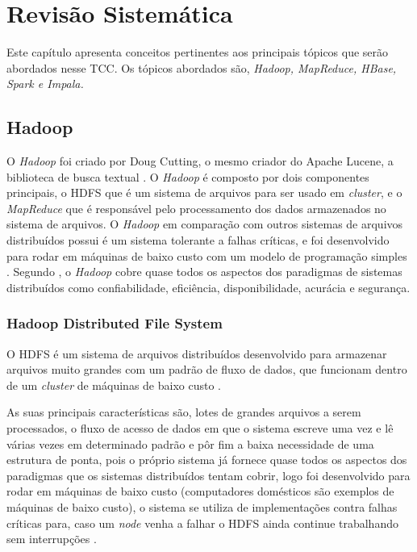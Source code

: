 \chapter[Revisão Sistemática]{Revisão Sistemática}

    Este capítulo apresenta conceitos pertinentes aos principais tópicos que serão abordados
    nesse TCC. Os tópicos abordados são, \textit{Hadoop, MapReduce, HBase, Spark e Impala.}

    \section{Hadoop}

            O \textit{Hadoop} foi criado por Doug Cutting, o mesmo criador do Apache Lucene, a biblioteca de busca
            textual \cite{white2015}. O \textit{Hadoop} é composto por dois componentes principais, o HDFS que é
            um sistema de arquivos para ser usado em \textit{cluster}, e o \textit{MapReduce} que é responsável
            pelo processamento dos dados armazenados no sistema de arquivos. O \textit{Hadoop} em comparação
            com outros sistemas de arquivos distribuídos possui é um sistema tolerante a falhas críticas, e foi
            desenvolvido para rodar em máquinas de baixo custo com um modelo de programação simples
            \cite{alam2014}. Segundo , o \textit{Hadoop} cobre quase todos os aspectos dos
            paradigmas de sistemas distribuídos como confiabilidade, eficiência, disponibilidade, acurácia e segurança.

        \subsection{Hadoop Distributed File System}

            O HDFS é um sistema de arquivos distribuídos desenvolvido para armazenar arquivos muito grandes
            com um padrão de fluxo de dados, que funcionam dentro de um \textit{cluster} de máquinas de baixo
            custo \cite{white2015}.

            As suas principais características são, lotes de grandes arquivos a serem processados, o fluxo de acesso
            de dados em que o sistema escreve uma vez e lê várias vezes em determinado padrão e pôr fim a baixa
            necessidade de uma estrutura de ponta, pois o próprio sistema já fornece quase todos os aspectos dos
            paradigmas que os sistemas distribuídos tentam cobrir, logo foi desenvolvido para rodar em máquinas de
            baixo custo (computadores domésticos são exemplos de máquinas de baixo custo), o sistema se utiliza de
            implementações contra falhas críticas para, caso um \textit{node} venha a falhar o HDFS ainda continue
            trabalhando sem interrupções \cite{white2015}.

